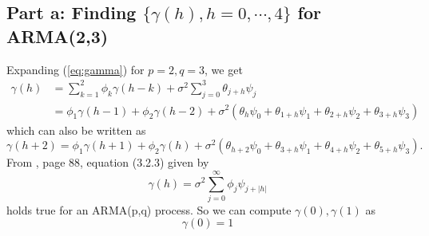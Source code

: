 \documentclass[11pt, oneside]{article}   	%
\begin{document}
\subsection{Part a: Finding $\{ \gamma(h), h = 0, \cdots, 4\}$ for  ARMA(2,3)}
Expanding (\ref{eq:gamma})  for $p=2, q=3$, we get
\begin{equation}
\begin{aligned}
\gamma(h) &= \sum_{k=1}^{2}\phi_{k}\gamma(h-k) + \sigma^{2}\sum_{j=0}^{3}\theta_{j+h}\psi_{j}\\
&=\phi_{1}\gamma(h-1) + \phi_{2}\gamma(h-2) + \sigma^{2}(\theta_{h}\psi_{0} + \theta_{1+h}\psi_{1} + \theta_{2+h}\psi_{2}+\theta_{3+h}\psi_{3} )
\end{aligned}
\end{equation}
which can also be written as 
\begin{equation}\label{eq:gamma0}
\gamma(h+2) = \phi_{1}\gamma(h+1) + \phi_{2}\gamma(h) + \sigma^{2}(\theta_{h+2}\psi_{0} + \theta_{3+h}\psi_{1} + \theta_{4+h}\psi_{2}+\theta_{5+h}\psi_{3} ).
\end{equation}
From \cite{petter}, page 88, equation (3.2.3) given by
\begin{equation}
\gamma(h) = \sigma^{2}\sum_{j=0}^{\infty}\phi_{j}\psi_{j+|h|}
\end{equation}
holds true for an ARMA(p,q) process. So we can compute $\gamma(0), \gamma(1)$ as 
\begin{equation}
\gamma(0) =  1
\end{equation}
\end{document}
